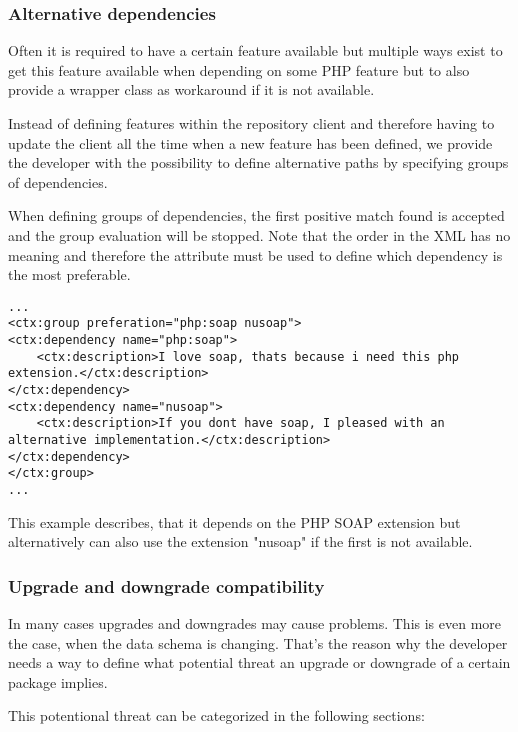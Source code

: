\subsubsection[sec:alternative dependencies]{Alternative dependencies}
Often it is required to have a certain feature available but multiple ways exist to get this feature available when depending on some PHP feature but to also provide a wrapper class as workaround if it is not available.

Instead of defining features within the repository client and therefore having to update the client all the time when a new feature has been defined, we provide the developer with the possibility to define alternative paths by specifying groups of dependencies.

When defining groups of dependencies, the first positive match found is accepted and the group evaluation will be stopped. Note that the order in the XML has no meaning and therefore the attribute  must be used to define which dependency is the most preferable.

\lstset{language=XML} 
\begin{lstlisting}[caption=XML example: alternative relationships]
...
<ctx:group preferation="php:soap nusoap">
<ctx:dependency name="php:soap">
    <ctx:description>I love soap, thats because i need this php extension.</ctx:description>
</ctx:dependency>
<ctx:dependency name="nusoap">
    <ctx:description>If you dont have soap, I pleased with an alternative implementation.</ctx:description>
</ctx:dependency>
</ctx:group>
...
\end{lstlisting}
This example describes, that it depends on the PHP SOAP extension but alternatively can also use the extension "nusoap" if the first is not available.

\subsubsection[sec:upgrade and downgrade compatibility]{Upgrade and downgrade compatibility}
In many cases upgrades and downgrades may cause problems. This is even more the case, when the data schema is changing.
That's the reason why the developer needs a way to define what potential threat an upgrade or downgrade of a certain package implies.

This potentional threat can be categorized in the following sections:

